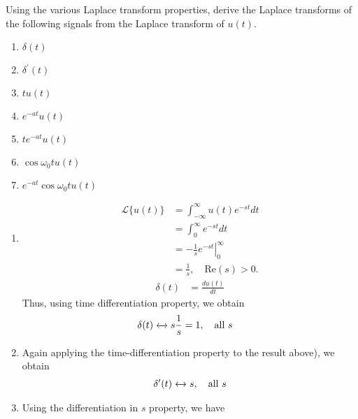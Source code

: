 \begin{frame}[allowframebreaks]{}
    \begin{example}
        Using the various Laplace transform properties, derive the Laplace transforms of the following signals from the Laplace transform of $u(t)$.
        \begin{enumerate}
          \item $\delta(t)$
          \item $\delta^\prime(t)$
          \item $tu(t)$
          \item $e^{-at}u(t)$
          \item $te^{-at}u(t)$
          \item $\cos \omega_0t u(t)$
          \item $e^{-at}\cos \omega_0t u(t)$
        \end{enumerate}
    \end{example}
    \pause
    {
        \begin{enumerate}
          \item
              \begin{align*}
                \mathcal{L}\{u(t)\}    &= \int_{-\infty}^\infty u(t)e^{-st}dt\\
                &= \int_{0}^\infty e^{-st}dt\\
                &= - \left.\frac{1}{s}e^{-st}\right|_0^\infty\\
                &= \frac{1}{s}, \quad \mathrm{Re}(s)>0.
              \end{align*}
              \pause
              \begin{align*}
                \delta(t) &= \frac{du(t)}{dt}
              \end{align*}
              Thus, using time differentiation property, we obtain
              \begin{align*}
                \delta(t) &\xleftrightarrow{} {s\frac{1}{s}} = 1, \quad \text{all } s
              \end{align*}
              \pause
          \item Again applying the time-differentiation property to the result above), we obtain
              \begin{align*}
                \delta^\prime(t) &\xleftrightarrow{} s, \quad \text{all } s\\
              \end{align*}
              \pause
          \item Using the differentiation in $s$ property, we have

\end{enumerate}}
\end{frame}
